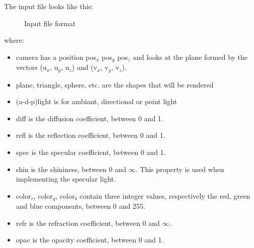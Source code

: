 \documentclass[a4paper,12pt,journal,twoside,compsoc]{PPIEEEtran}
\begin{document}
The input file looks like this: \\
\begin{figure}
\noindent{}\vspace{0.3cm}
\caption{Input file format}
\label{Fig:input}
\end{figure}
    where:
    \begin{itemize}
    	\small
    	\setlength{\itemsep}{0.2pt}
        \item camera has a position pos$_x$ pos$_y$ pos$_z$ and looks at the plane formed by the vectors (u$_x$, u$_y$, u$_z$) and (v$_x$, v$_y$, v$_z$).
        \item plane, triangle, sphere, etc. are the shapes that will be rendered
        \item (a-d-p)light is for ambiant, directional or point light
    	\item diff is the diffusion coefficient, between 0 and 1.
    	\item refl is the reflection coefficient, between 0 and 1.
        \item spec is the specular coefficient, between 0 and 1.
        \item shin is the shininess, between 0 and $\infty$. This property is used when implementing the specular light.
        \item color$_r$, color$_g$, color$_b$ contain three integer values, respectively the red, green and blue components, between 0 and 255.
		\item refr is the refraction coefficient, between 0 and $\infty$.
        \item opac is the opacity coefficient, between 0 and 1.
    \end{itemize}
\end{document}
